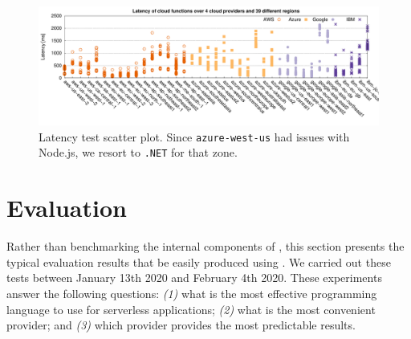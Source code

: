

\begin{figure}[!t]
\centering
\includegraphics[width=1.0\textwidth]{bilder/latency/latency.pdf}
\caption{Latency test scatter plot. Since \texttt{azure-west-us} had issues with Node.js, we resort to \texttt{.NET} for that zone.}
\label{fig:latency_plot}
\end{figure}

\section{Evaluation}
\label{sec:evaluation}
Rather than benchmarking the internal components of \sys, this section presents the typical evaluation results that be easily produced using \sys.
We carried out these tests between January 13th 2020 and February 4th 2020.
These experiments answer the following questions: 
\emph{(1)} what is the most effective programming language to use for serverless applications;
\emph{(2)} what is the most convenient provider; 
and \emph{(3)} which provider provides the most predictable results.

%


